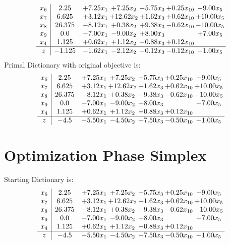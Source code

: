 \documentclass[9pt]{article}
\begin{document}
\[\begin{array}{c| c c@{\hskip 2pt} c@{\hskip 2pt} c@{\hskip 2pt} c@{\hskip 2pt} c@{\hskip 2pt} }
 x_{6}   &  2.25 & +  7.25 x_{1} & +  7.25 x_{2} & -5.75 x_{3} & +  0.25 x_{10} & -9.00 x_{5}\\
 x_{7}   &  6.625 & +  3.12 x_{1} & + 12.62 x_{2} & +  1.62 x_{3} & +  0.62 x_{10} & + 10.00 x_{5}\\
 x_{8}   &  26.375 & -8.12 x_{1} & +  0.38 x_{2} & +  9.38 x_{3} & -0.62 x_{10} & -10.00 x_{5}\\
 x_{9}   &  0.0 & -7.00 x_{1} & -9.00 x_{2} & +  8.00 x_{3} &   & +  7.00 x_{5}\\
 x_{4}   &  1.125 & +  0.62 x_{1} & +  1.12 x_{2} & -0.88 x_{3} & +  0.12 x_{10} &   \\
\hline
z    &  -1.125 & -1.62 x_{1} & -2.12 x_{2} & -0.12 x_{3} & -0.12 x_{10} & -1.00 x_{5}\\
\end{array}\]
Primal Dictionary with original objective is:
\[\begin{array}{c| c c@{\hskip 2pt} c@{\hskip 2pt} c@{\hskip 2pt} c@{\hskip 2pt} c@{\hskip 2pt} }
 x_{6}   &  2.25 & +  7.25 x_{1} & +  7.25 x_{2} & -5.75 x_{3} & +  0.25 x_{10} & -9.00 x_{5}\\
 x_{7}   &  6.625 & +  3.12 x_{1} & + 12.62 x_{2} & +  1.62 x_{3} & +  0.62 x_{10} & + 10.00 x_{5}\\
 x_{8}   &  26.375 & -8.12 x_{1} & +  0.38 x_{2} & +  9.38 x_{3} & -0.62 x_{10} & -10.00 x_{5}\\
 x_{9}   &  0.0 & -7.00 x_{1} & -9.00 x_{2} & +  8.00 x_{3} &   & +  7.00 x_{5}\\
 x_{4}   &  1.125 & +  0.62 x_{1} & +  1.12 x_{2} & -0.88 x_{3} & +  0.12 x_{10} &   \\
\hline
z    &  -4.5 & -5.50 x_{1} & -4.50 x_{2} & +  7.50 x_{3} & -0.50 x_{10} & +  1.00 x_{5}\\
\end{array}\]
\section{Optimization Phase Simplex}
Starting Dictionary is:
\[\begin{array}{c| c c@{\hskip 2pt} c@{\hskip 2pt} c@{\hskip 2pt} c@{\hskip 2pt} c@{\hskip 2pt} }
 x_{6}   &  2.25 & +  7.25 x_{1} & +  7.25 x_{2} & -5.75 x_{3} & +  0.25 x_{10} & -9.00 x_{5}\\
 x_{7}   &  6.625 & +  3.12 x_{1} & + 12.62 x_{2} & +  1.62 x_{3} & +  0.62 x_{10} & + 10.00 x_{5}\\
 x_{8}   &  26.375 & -8.12 x_{1} & +  0.38 x_{2} & +  9.38 x_{3} & -0.62 x_{10} & -10.00 x_{5}\\
 x_{9}   &  0.0 & -7.00 x_{1} & -9.00 x_{2} & +  8.00 x_{3} &   & +  7.00 x_{5}\\
 x_{4}   &  1.125 & +  0.62 x_{1} & +  1.12 x_{2} & -0.88 x_{3} & +  0.12 x_{10} &   \\
\hline
z    &  -4.5 & -5.50 x_{1} & -4.50 x_{2} & +  7.50 x_{3} & -0.50 x_{10} & +  1.00 x_{5}\\
\end{array}\]
\end{document}
